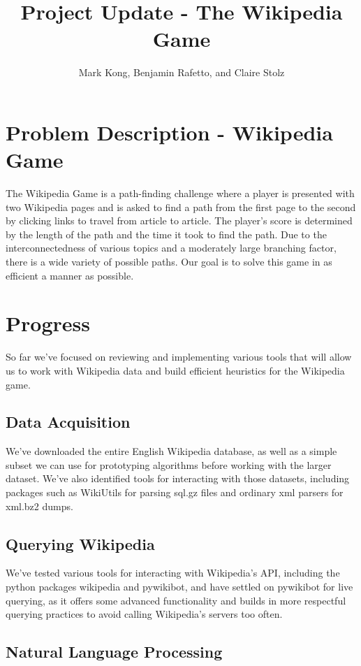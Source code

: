 \documentclass[11pt]{article}
\title{Project Update - The Wikipedia Game}
\author{Mark Kong, Benjamin Rafetto, and Claire Stolz}
\begin{document}
\maketitle{}


\section{Problem Description - Wikipedia Game}
The Wikipedia Game is a path-finding challenge where a player is presented with two Wikipedia pages and is asked to find a path from the first page to the second by clicking links to travel from article to article. The player's score is determined by the length of the path and the time it took to find the path. Due to the interconnectedness of various topics and a moderately large branching factor, there is a wide variety of possible paths. Our goal is to solve this game in as efficient a manner as possible.

\section{Progress}

So far we've focused on reviewing and implementing various tools that will allow us to work with Wikipedia data and build efficient heuristics for the Wikipedia game.

\subsection{Data Acquisition}

We've downloaded the entire English Wikipedia database, as well as a simple subset we can use for prototyping algorithms before working with the larger dataset. We've also identified tools for interacting with those datasets, including packages such as WikiUtils for parsing sql.gz files and ordinary xml parsers for xml.bz2 dumps.

\subsection{Querying Wikipedia}

We've tested various tools for interacting with Wikipedia's API, including the python packages wikipedia and pywikibot, and have settled on pywikibot for live querying, as it offers some advanced functionality and builds in more respectful querying practices to avoid calling Wikipedia's servers too often.

\subsection{Natural Language Processing}
\end{document}

